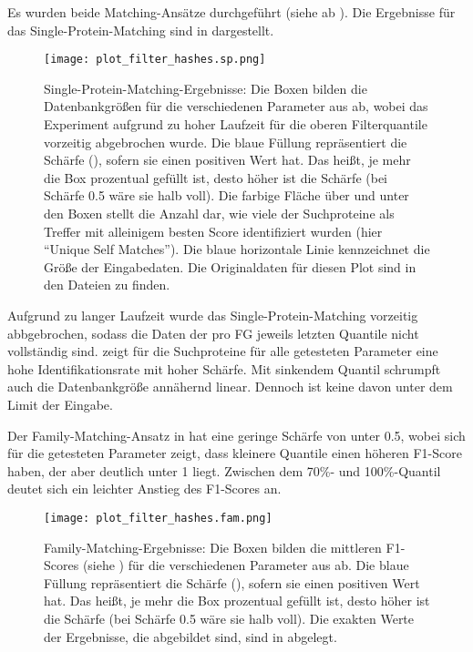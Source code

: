         Es wurden beide Matching-Ansätze durchgeführt (siehe ab ). Die Ergebnisse für das Single-Protein-Matching sind in  dargestellt.

        \begin{figure}[H]
            \centering
            \texttt{[image: plot\_filter\_hashes.sp.png]}
            \caption[Single-Protein-Matching ]{Single-Protein-Matching-Ergebnisse: Die Boxen bilden die Datenbankgrößen für die verschiedenen Parameter aus  ab, wobei das Experiment aufgrund zu hoher Laufzeit für die oberen Filterquantile vorzeitig abgebrochen wurde. Die blaue Füllung repräsentiert die Schärfe (), sofern sie einen positiven Wert hat. Das heißt, je mehr die Box prozentual gefüllt ist, desto höher ist die Schärfe (bei Schärfe 0.5 wäre sie halb voll). Die farbige Fläche über und unter den Boxen stellt die Anzahl dar, wie viele der Suchproteine als Treffer mit alleinigem besten Score identifiziert wurden (hier ``Unique Self Matches''). Die blaue horizontale Linie kennzeichnet die Größe der Eingabedaten. Die Originaldaten für diesen Plot sind in den Dateien  zu finden.}
            \label{fig:filter_hashes.sp}
        \end{figure}

        Aufgrund zu langer Laufzeit wurde das Single-Protein-Matching vorzeitig abbgebrochen, sodass die Daten der pro \ac{FG} jeweils letzten Quantile nicht vollständig sind.  zeigt für die Suchproteine für alle getesteten Parameter eine hohe Identifikationsrate mit hoher Schärfe. Mit sinkendem Quantil schrumpft auch die Datenbankgröße annähernd linear. Dennoch ist keine davon unter dem Limit der Eingabe.

        Der Family-Matching-Ansatz in  hat eine geringe Schärfe von unter 0.5, wobei sich für die getesteten Parameter zeigt, dass kleinere Quantile einen höheren F1-Score haben, der aber deutlich unter 1 liegt. Zwischen dem 70\%- und 100\%-Quantil deutet sich ein leichter Anstieg des F1-Scores an.

        \begin{figure}[H]
            \centering
            \texttt{[image: plot\_filter\_hashes.fam.png]}
            \caption[Family-Matching ]{Family-Matching-Ergebnisse: Die Boxen bilden die mittleren F1-Scores (siehe ) für die verschiedenen Parameter aus  ab. Die blaue Füllung repräsentiert die Schärfe (), sofern sie einen positiven Wert hat. Das heißt, je mehr die Box prozentual gefüllt ist, desto höher ist die Schärfe (bei Schärfe 0.5 wäre sie halb voll). Die exakten Werte der Ergebnisse, die abgebildet sind, sind in  abgelegt.}
            \label{fig:filter_hashes.fam}
        \end{figure}

